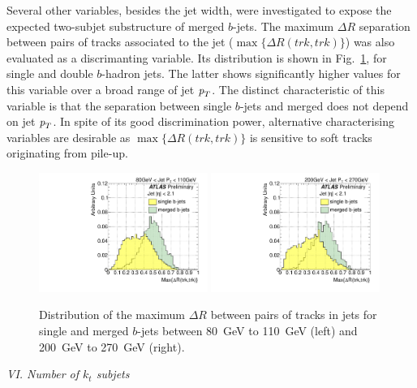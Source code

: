 Several other variables, besides the jet width, were investigated to expose the expected two-subjet substructure of merged $b$-jets.  The maximum $\Delta R$ separation between pairs of tracks associated to the jet ($\max\{\Delta R(trk,trk)\}$) was also evaluated as a discrimanting variable. Its distribution is shown in Fig.~\ref{fig:drmaxsinglemerged}, for single and double $b$-hadron jets. The latter shows significantly higher values for this variable over a broad range of jet ${\emph{p}_{T}}$. The distinct characteristic of this variable is that the separation between single $b$-jets and merged does not depend on jet ${\emph{p}_{T}}$. In spite of its good discrimination power, alternative characterising variables are desirable as $\max\{\Delta R(trk,trk)\}$ is sensitive to soft tracks originating from pile-up. 
\vspace{3 mm}
\begin{figure}[tp]
\centering
\includegraphics[width=0.49\textwidth]{FIGS/VarsSingleMerged/drmax080.pdf}
\includegraphics[width=0.49\textwidth]{FIGS/VarsSingleMerged/drmax200.pdf}
\caption{Distribution of the maximum $\Delta R$ between pairs of tracks in jets for single and merged $b$-jets between 80~GeV to 110~GeV (left) and 200~GeV to 270~GeV (right).}
\label{fig:drmaxsinglemerged}
\end{figure}


{ \em VI. Number of $k_t$ subjets}
\vspace{3 mm}


